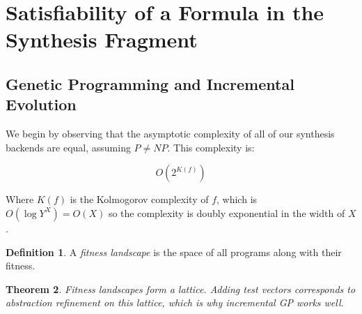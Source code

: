 \documentclass[preprint]{sigplanconf}
\newtheorem{theorem}{Theorem}
\newtheorem{conjecture}[theorem]{Conjecture}
\theoremstyle{definition}
\newtheorem{definition}[theorem]{Definition}
\begin{document}


\section{Satisfiability of a Formula in the Synthesis Fragment} \label{sec:synthesis}
%
\iffalse
\subsection{The Search Space and the Kolmogorov Complexity of a Ranking Function}
\begin{conjecture}
The lexicographic ordering does not influence the size of the search space. Thus, finding potentially lexicographic termination arguments is not more difficult than finding non-lexicographic ones.   
\end{conjecture}

As a consequence of the aforementioned conjecture, we do not need to commit to a specific form of the termination argument. While other approaches, e.g. \cite{DBLP:conf/tacas/LeikeH14}, 
conduct independent searches for each possible form of the ranking function with some of them futile whenever the assumed constrained ranking function does not exist, we have a single search that aims at finding the ranking function with the lowest Kolmogorov complexity. 
\fi
%
%


\subsection{Genetic Programming and Incremental Evolution} \label{sec:gp}

We begin by observing that the asymptotic complexity of all of our synthesis
backends are equal, assuming $P \neq NP$.  This complexity is:

$$O\left(2^{K(f)}\right)$$

Where $K(f)$ is the Kolmogorov complexity of $f$, which is $O(\log Y^X) = O(X)$
so the complexity is doubly exponential in the width of $X$.

\begin{definition}
 A \emph{fitness landscape} is the space of all programs along with their fitness.
\end{definition}

\begin{theorem}
 Fitness landscapes form a lattice.  Adding test vectors corresponds to abstraction refinement on this
 lattice, which is why incremental GP works well.
\end{theorem}
\end{document}
